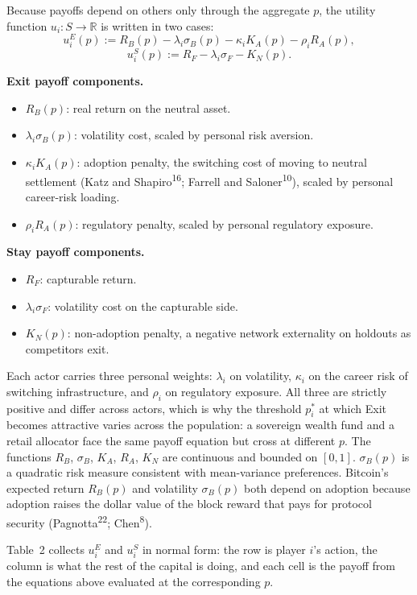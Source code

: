 \documentclass[12pt]{article}
\theoremstyle{definition}
\theoremstyle{remark}
\begin{document}
Because payoffs depend on others only through the aggregate $p$, the utility function $u_i : S \to \mathbb{R}$ is written in two cases:
\[
u_i^E(p) := R_B(p) - \lambda_i \sigma_B(p) - \kappa_i K_A(p) - \rho_i R_A(p),
\]
\[
u_i^S(p) := R_F - \lambda_i \sigma_F - K_N(p).
\]

\smallskip
\noindent\textbf{Exit payoff components.}
\begin{itemize}[nosep,leftmargin=*]
\item $R_B(p)$: real return on the neutral asset.
\item $\lambda_i \sigma_B(p)$: volatility cost, scaled by personal risk aversion.
\item $\kappa_i K_A(p)$: adoption penalty, the switching cost of moving to neutral settlement (Katz and Shapiro\textsuperscript{16}; Farrell and Saloner\textsuperscript{10}), scaled by personal career-risk loading.
\item $\rho_i R_A(p)$: regulatory penalty, scaled by personal regulatory exposure.
\end{itemize}

\smallskip
\noindent\textbf{Stay payoff components.}
\begin{itemize}[nosep,leftmargin=*]
\item $R_F$: capturable return.
\item $\lambda_i \sigma_F$: volatility cost on the capturable side.
\item $K_N(p)$: non-adoption penalty, a negative network externality on holdouts as competitors exit.
\end{itemize}

\smallskip
\noindent Each actor carries three personal weights: $\lambda_i$ on
volatility, $\kappa_i$ on the career risk of switching infrastructure,
and $\rho_i$ on regulatory exposure. All three are strictly positive
and differ across actors, which is why the threshold $p_i^*$ at
which Exit becomes attractive varies across the population: a
sovereign wealth fund and a retail allocator face the same payoff
equation but cross at different $p$. The functions $R_B$, $\sigma_B$, $K_A$, $R_A$, $K_N$ are continuous and bounded on $[0,1]$. $\sigma_B(p)$ is a quadratic risk measure consistent with mean-variance preferences. Bitcoin's expected return $R_B(p)$ and volatility
$\sigma_B(p)$ both depend on adoption because adoption raises
the dollar value of the block reward that pays for protocol
security (Pagnotta\textsuperscript{22}; Chen\textsuperscript{8}).

\smallskip
\noindent Table~2 collects $u_i^E$ and $u_i^S$ in normal form: the
row is player $i$'s action, the column is what the rest of the
capital is doing, and each cell is the payoff from the equations
above evaluated at the corresponding $p$.
\end{document}

